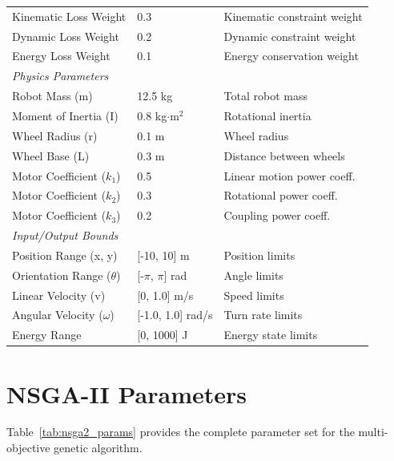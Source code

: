 \begin{table}[htbp]
\begin{tabular}{@{}lll@{}}
Kinematic Loss Weight & 0.3 & Kinematic constraint weight \\
Dynamic Loss Weight & 0.2 & Dynamic constraint weight \\
Energy Loss Weight & 0.1 & Energy conservation weight \\
\midrule
\multicolumn{3}{l}{\textit{Physics Parameters}} \\
Robot Mass (m) & 12.5 kg & Total robot mass \\
Moment of Inertia (I) & 0.8 kg$\cdot$m$^2$ & Rotational inertia \\
Wheel Radius (r) & 0.1 m & Wheel radius \\
Wheel Base (L) & 0.3 m & Distance between wheels \\
Motor Coefficient ($k_1$) & 0.5 & Linear motion power coeff. \\
Motor Coefficient ($k_2$) & 0.3 & Rotational power coeff. \\
Motor Coefficient ($k_3$) & 0.2 & Coupling power coeff. \\
\midrule
\multicolumn{3}{l}{\textit{Input/Output Bounds}} \\
Position Range (x, y) & [-10, 10] m & Position limits \\
Orientation Range ($\theta$) & [-$\pi$, $\pi$] rad & Angle limits \\
Linear Velocity (v) & [0, 1.0] m/s & Speed limits \\
Angular Velocity ($\omega$) & [-1.0, 1.0] rad/s & Turn rate limits \\
Energy Range & [0, 1000] J & Energy state limits \\
\bottomrule
\end{tabular}
\end{table}

\section{NSGA-II Parameters}
\label{sec:nsga2_params}

Table~\ref{tab:nsga2_params} provides the complete parameter set for the multi-objective genetic algorithm.

